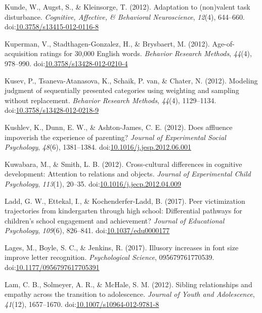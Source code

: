 \documentclass[english,man]{apa6}
\begin{document}
\hypertarget{ref-Kunde2012}{}
Kunde, W., Augst, S., \& Kleinsorge, T. (2012). Adaptation to
(non)valent task disturbance. \emph{Cognitive, Affective, \& Behavioral
Neuroscience}, \emph{12}(4), 644--660.
doi:\href{https://doi.org/10.3758/s13415-012-0116-8}{10.3758/s13415-012-0116-8}

\hypertarget{ref-Kuperman2012}{}
Kuperman, V., Stadthagen-Gonzalez, H., \& Brysbaert, M. (2012).
Age-of-acquisition ratings for 30,000 English words. \emph{Behavior
Research Methods}, \emph{44}(4), 978--990.
doi:\href{https://doi.org/10.3758/s13428-012-0210-4}{10.3758/s13428-012-0210-4}

\hypertarget{ref-Kusev2012}{}
Kusev, P., Tsaneva-Atanasova, K., Schaik, P. van, \& Chater, N. (2012).
Modeling judgment of sequentially presented categories using weighting
and sampling without replacement. \emph{Behavior Research Methods},
\emph{44}(4), 1129--1134.
doi:\href{https://doi.org/10.3758/s13428-012-0218-9}{10.3758/s13428-012-0218-9}

\hypertarget{ref-Kushlev2012}{}
Kushlev, K., Dunn, E. W., \& Ashton-James, C. E. (2012). Does affluence
impoverish the experience of parenting? \emph{Journal of Experimental
Social Psychology}, \emph{48}(6), 1381--1384.
doi:\href{https://doi.org/10.1016/j.jesp.2012.06.001}{10.1016/j.jesp.2012.06.001}

\hypertarget{ref-Kuwabara2012}{}
Kuwabara, M., \& Smith, L. B. (2012). Cross-cultural differences in
cognitive development: Attention to relations and objects. \emph{Journal
of Experimental Child Psychology}, \emph{113}(1), 20--35.
doi:\href{https://doi.org/10.1016/j.jecp.2012.04.009}{10.1016/j.jecp.2012.04.009}

\hypertarget{ref-Ladd2017}{}
Ladd, G. W., Ettekal, I., \& Kochenderfer-Ladd, B. (2017). Peer
victimization trajectories from kindergarten through high school:
Differential pathways for children's school engagement and achievement?
\emph{Journal of Educational Psychology}, \emph{109}(6), 826--841.
doi:\href{https://doi.org/10.1037/edu0000177}{10.1037/edu0000177}

\hypertarget{ref-Lages2017}{}
Lages, M., Boyle, S. C., \& Jenkins, R. (2017). Illusory increases in
font size improve letter recognition. \emph{Psychological Science},
095679761770539.
doi:\href{https://doi.org/10.1177/0956797617705391}{10.1177/0956797617705391}

\hypertarget{ref-Lam2012}{}
Lam, C. B., Solmeyer, A. R., \& McHale, S. M. (2012). Sibling
relationships and empathy across the transition to adolescence.
\emph{Journal of Youth and Adolescence}, \emph{41}(12), 1657--1670.
doi:\href{https://doi.org/10.1007/s10964-012-9781-8}{10.1007/s10964-012-9781-8}
\end{document}
